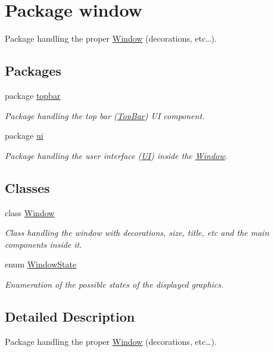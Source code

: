 \hypertarget{namespacewindow}{\section{Package window}
\label{namespacewindow}
}


Package handling the proper \hyperlink{classwindow_1_1_window}{Window} (decorations, etc…).  


\subsection*{Packages}
\begin{DoxyCompactItemize}
\item 
package \hyperlink{namespacewindow_1_1topbar}{topbar}
\begin{DoxyCompactList}\small\item\em Package handling the top bar (\hyperlink{classwindow_1_1topbar_1_1_top_bar}{Top\-Bar}) U\-I component. \end{DoxyCompactList}\item 
package \hyperlink{namespacewindow_1_1ui}{ui}
\begin{DoxyCompactList}\small\item\em Package handling the user interface (\hyperlink{classwindow_1_1ui_1_1_u_i}{U\-I}) inside the \hyperlink{classwindow_1_1_window}{Window}. \end{DoxyCompactList}\end{DoxyCompactItemize}
\subsection*{Classes}
\begin{DoxyCompactItemize}
\item 
class \hyperlink{classwindow_1_1_window}{Window}
\begin{DoxyCompactList}\small\item\em Class handling the window with decorations, size, title, etc and the main components inside it. \end{DoxyCompactList}\item 
enum \hyperlink{enumwindow_1_1_window_state}{Window\-State}
\begin{DoxyCompactList}\small\item\em Enumeration of the possible states of the displayed graphics. \end{DoxyCompactList}\end{DoxyCompactItemize}


\subsection{Detailed Description}
Package handling the proper \hyperlink{classwindow_1_1_window}{Window} (decorations, etc…). 